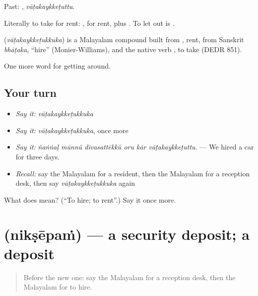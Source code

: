 Past: , \emph{vāṭakaykkeṭuttu}.

Literally to take for rent: , for rent, plus . To let out is  .

\begin{cousinweb}
\textbf{} (\emph{vāṭakaykkeṭukkuka}) is a Malayalam compound built from , rent, from Sanskrit \emph{bhāṭaka}, \textquotedblleft{}hire\textquotedblright{} (Monier-Williams), and the native verb , to take (DEDR 851).
\end{cousinweb}

\begin{grammarlens}[title={What you've built}]
One more word for getting around.
\end{grammarlens}

\subsection*{Your turn}
\begin{itemize}
\raggedright
  \item \emph{Say it:} \emph{vāṭakaykkeṭukkuka}
  \item \emph{Say it:} \emph{vāṭakaykkeṭukkuka}, once more
  \item \emph{Say it:} \emph{ñaṅṅaḷ mūnnŭ divasattēkkŭ oru kār vāṭakaykkeṭuttu.} — We hired a car for three days.
  \item \emph{Recall:} say the Malayalam for a resident, then the Malayalam for a reception desk, then say \emph{vāṭakaykkeṭukkuka} again
\end{itemize}

\begin{tcolorbox}[breakable,colback=teal!4,colframe=teal!35!black,title={Before you move on}]
What does  mean? (\textquotedblleft{}To hire; to rent\textquotedblright{}.) Say it once more.
\end{tcolorbox}
\section[\texorpdfstring{\ml{നിക്ഷേപം} (nikṣēpaṁ)}{നിക്ഷേപം (nikṣēpaṁ)}]{ (nikṣēpaṁ) — a security deposit; a deposit}

\label{lesson:ML-C482-niksepam}



\begin{quote}
Before the new one: say the Malayalam for a reception desk, then the Malayalam for to hire.
\end{quote}

